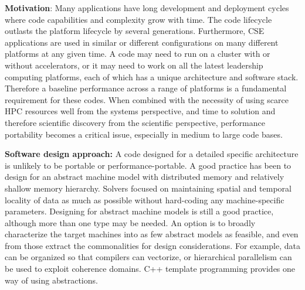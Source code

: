 \documentclass[]{article}
\date{}
\begin{document}
\pagestyle{fancy}
\renewcommand{\headrulewidth}{0pt}
  
\thispagestyle{empty}

\textbf{\newline \newline \newline Motivation}: Many applications have long development and
deployment cycles where code capabilities and complexity grow with time.
The code lifecycle outlasts the platform lifecycle by several
generations. Furthermore, CSE applications are used in similar or
different configurations on many different platforms at any given time.
A code may need to run on a cluster with or without accelerators, or it
may need to work on all the latest leadership computing platforms, each
of which has a unique architecture and software stack. Therefore a
baseline performance across a range of platforms is a fundamental
requirement for these codes. When combined with the necessity of using
scarce HPC resources well from the systems perspective, and time to
solution and therefore scientific discovery from the scientific
perspective, performance portability becomes a critical issue,
especially in medium to large code bases.

\textbf{Software design approach:} A code designed for a detailed
specific architecture is unlikely to be portable or
performance-portable. A good practice has been to design for an abstract
machine model with distributed memory and relatively shallow memory
hierarchy. Solvers focused on maintaining spatial and temporal locality
of data as much as possible without hard-coding any machine-specific
parameters. Designing for abstract machine models is still a good
practice, although more than one type may be needed. An option is to
broadly characterize the target machines into as few abstract models as
feasible, and even from those extract the commonalities for design
considerations. For example, data can be organized so that compilers can
vectorize, or hierarchical parallelism can be used to exploit coherence
domains. C++ template programming provides one way of using
abstractions.
\end{document}
